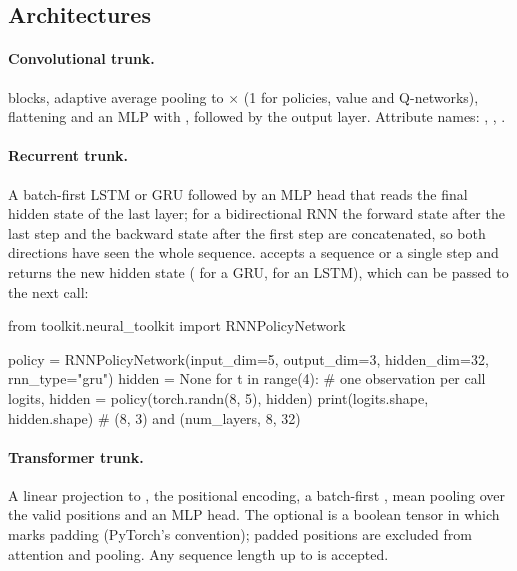 \subsection{Architectures}\label{sec:neural-architectures}

\paragraph{Convolutional trunk.}
 blocks, adaptive
average pooling to  $\times$  (1 for
policies, value and Q-networks), flattening and an MLP with ,
followed by the output layer. Attribute names: ,
, .

\paragraph{Recurrent trunk.}
A batch-first LSTM or GRU followed by an MLP head that reads the final hidden
state of the last layer; for a bidirectional RNN the forward state after the
last step and the backward state after the first step are concatenated, so
both directions have seen the whole sequence. 
accepts a sequence or a single step  and returns the new hidden
state ( for a GRU,  for an LSTM), which can be
passed to the next call:

\begin{pycode}
from toolkit.neural_toolkit import RNNPolicyNetwork

policy = RNNPolicyNetwork(input_dim=5, output_dim=3, hidden_dim=32, rnn_type="gru")
hidden = None
for t in range(4):                         # one observation per call
    logits, hidden = policy(torch.randn(8, 5), hidden)
print(logits.shape, hidden.shape)          # (8, 3) and (num_layers, 8, 32)
\end{pycode}

\paragraph{Transformer trunk.}
A linear projection to , the positional encoding, a batch-first
, mean pooling over the valid positions and an MLP
head. The optional  is a boolean  tensor in which
 marks padding (PyTorch's 
convention); padded positions are excluded from attention and pooling.
Any sequence length up to  is accepted.

